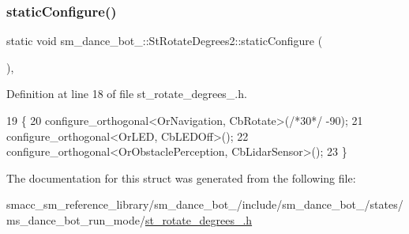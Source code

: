 \subsubsection{\texorpdfstring{static\+Configure()}{staticConfigure()}}
{\footnotesize\ttfamily static void sm\+\_\+dance\+\_\+bot\+\_\+::\+St\+Rotate\+Degrees2\+::static\+Configure (\begin{DoxyParamCaption}{ }\end{DoxyParamCaption})\hspace{0.3cm}{\ttfamily [inline]}, {\ttfamily [static]}}



Definition at line 18 of file st\+\_\+rotate\+\_\+degrees\+\_.\+h.


\begin{DoxyCode}
19   \{
20     configure\_orthogonal<OrNavigation, CbRotate>(\textcolor{comment}{/*30*/} -90);
21     configure\_orthogonal<OrLED, CbLEDOff>();
22     configure\_orthogonal<OrObstaclePerception, CbLidarSensor>();
23   \}
\end{DoxyCode}


The documentation for this struct was generated from the following file\+:\begin{DoxyCompactItemize}
\item 
smacc\+\_\+sm\+\_\+reference\+\_\+library/sm\+\_\+dance\+\_\+bot\+\_/include/sm\+\_\+dance\+\_\+bot\+\_/states/ms\+\_\+dance\+\_\+bot\+\_\+run\+\_\+mode/\hyperlink{2_2include_2sm__dance__bot__2_2states_2ms__dance__bot__run__mode_2st__rotate__degrees__2_8h}{st\+\_\+rotate\+\_\+degrees\+\_.\+h}\end{DoxyCompactItemize}
